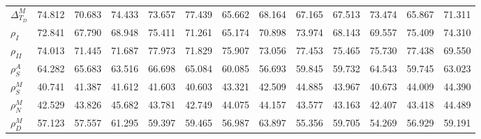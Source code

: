 \begin{center}
\begin{longtable}{lcccccccccccc}
$ {\Delta^{M}_{T_D}}   $	 & 	      74.812	 & 	      70.683	 & 	      74.433	 & 	      73.657	 & 	      77.439	 & 	      65.662	 & 	      68.164	 & 	      67.165	 & 	      67.513	 & 	      73.474	 & 	      65.867	 & 	      71.311 \\ 
$ {\rho_{I}}           $	 & 	      72.841	 & 	      67.790	 & 	      68.948	 & 	      75.411	 & 	      71.261	 & 	      65.174	 & 	      70.898	 & 	      73.974	 & 	      68.143	 & 	      69.557	 & 	      75.409	 & 	      74.310 \\ 
$ {\rho_{II}}          $	 & 	      74.013	 & 	      71.445	 & 	      71.687	 & 	      77.973	 & 	      71.829	 & 	      75.907	 & 	      73.056	 & 	      77.453	 & 	      75.465	 & 	      75.730	 & 	      77.438	 & 	      69.550 \\ 
$ {\rho^{A}_{S}}       $	 & 	      64.282	 & 	      65.683	 & 	      63.516	 & 	      66.698	 & 	      65.084	 & 	      60.085	 & 	      56.693	 & 	      59.845	 & 	      59.732	 & 	      64.543	 & 	      59.745	 & 	      63.023 \\ 
$ {\rho^{M}_{S}}       $	 & 	      40.741	 & 	      41.387	 & 	      41.612	 & 	      41.603	 & 	      40.603	 & 	      43.321	 & 	      42.509	 & 	      44.885	 & 	      43.967	 & 	      40.673	 & 	      44.009	 & 	      44.390 \\ 
$ {\rho^{M}_{N}}       $	 & 	      42.529	 & 	      43.826	 & 	      45.682	 & 	      43.781	 & 	      42.749	 & 	      44.075	 & 	      44.157	 & 	      43.577	 & 	      43.163	 & 	      42.407	 & 	      43.418	 & 	      44.489 \\ 
$ {\rho^{M}_{D}}       $	 & 	      57.123	 & 	      57.557	 & 	      61.295	 & 	      59.397	 & 	      59.465	 & 	      56.987	 & 	      63.897	 & 	      55.356	 & 	      59.705	 & 	      54.269	 & 	      56.929	 & 	      59.191 \\ 
\end{longtable}
 \end{center}
